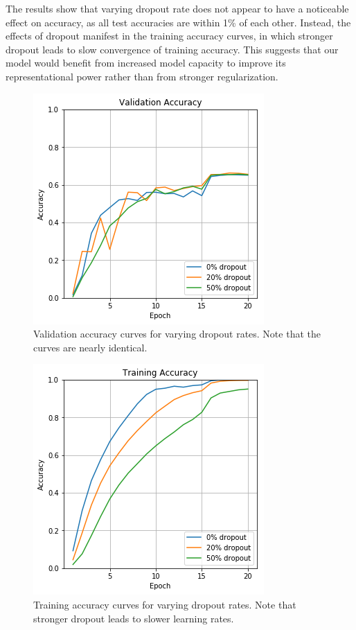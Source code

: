 \documentclass[10pt,twocolumn,letterpaper]{article}
\begin{document}
The results show that varying dropout rate does not appear to have a noticeable effect on accuracy, as all test accuracies are within 1\% of each other. Instead, the effects of dropout manifest in the training accuracy curves, in which stronger dropout leads to slow convergence of training accuracy. This suggests that our model would benefit from increased model capacity to improve its representational power rather than from stronger regularization.

\begin{figure}[h]
	\begin{center}
	\includegraphics[width=0.75\linewidth]{dropout-val-acc}
	\caption{Validation accuracy curves for varying dropout rates. Note that the curves are nearly identical.}
	\end{center}
\end{figure}

\begin{figure}[h]
	\begin{center}
	\includegraphics[width=0.75\linewidth]{dropout-train-acc}
	\caption{Training accuracy curves for varying dropout rates. Note that stronger dropout leads to slower learning rates.}
	\end{center}
\end{figure}
\end{document}
